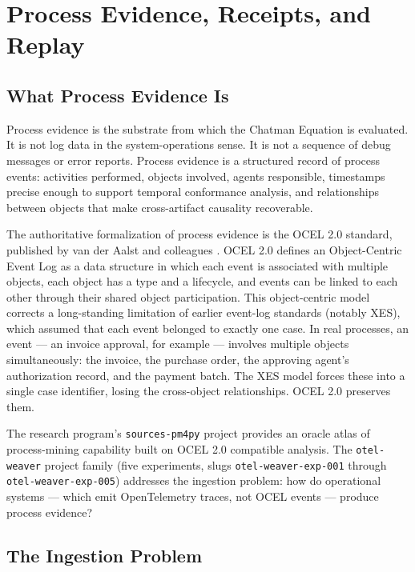 \chapter{Process Evidence, Receipts, and Replay}
\label{chap:process_evidence}

\section{What Process Evidence Is}

Process evidence is the substrate from which the Chatman Equation is evaluated. It is not log data in the system-operations sense. It is not a sequence of debug messages or error reports. Process evidence is a structured record of process events: activities performed, objects involved, agents responsible, timestamps precise enough to support temporal conformance analysis, and relationships between objects that make cross-artifact causality recoverable.

The authoritative formalization of process evidence is the OCEL 2.0 standard, published by van der Aalst and colleagues \cite{vanderaalst2022ocel}. OCEL 2.0 defines an Object-Centric Event Log as a data structure in which each event is associated with multiple objects, each object has a type and a lifecycle, and events can be linked to each other through their shared object participation. This object-centric model corrects a long-standing limitation of earlier event-log standards (notably XES), which assumed that each event belonged to exactly one case. In real processes, an event --- an invoice approval, for example --- involves multiple objects simultaneously: the invoice, the purchase order, the approving agent's authorization record, and the payment batch. The XES model forces these into a single case identifier, losing the cross-object relationships. OCEL 2.0 preserves them.

The research program's \texttt{sources-pm4py} project provides an oracle atlas of process-mining capability built on OCEL 2.0 compatible analysis. The \texttt{otel-weaver} project family (five experiments, slugs \texttt{otel-weaver-exp-001} through \texttt{otel-weaver-exp-005}) addresses the ingestion problem: how do operational systems --- which emit OpenTelemetry traces, not OCEL events --- produce process evidence?

\section{The Ingestion Problem}

